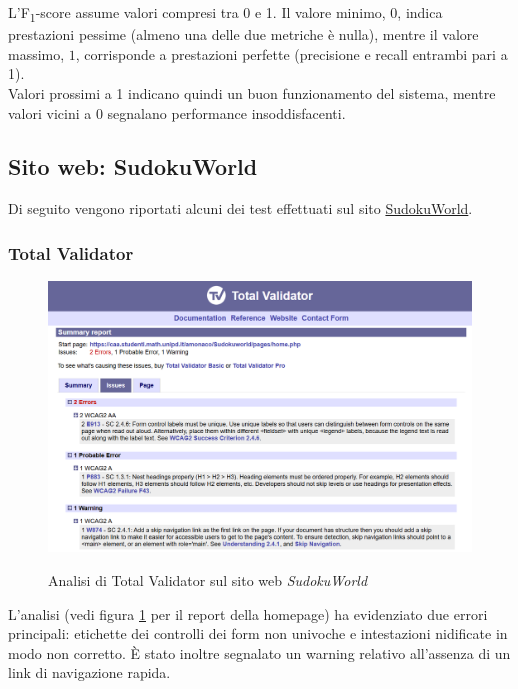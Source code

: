 \noindent L’F\textsubscript{1}-score assume valori compresi tra 0 e 1. Il valore minimo, \(0\), indica prestazioni pessime (almeno una delle due metriche è nulla), mentre il valore massimo, \(1\), corrisponde a prestazioni perfette (precisione e recall entrambi pari a 1).\\
Valori prossimi a 1 indicano quindi un buon funzionamento del sistema, mentre valori vicini a 0 segnalano performance insoddisfacenti.


\subsection{Sito web: SudokuWorld}
\noindent Di seguito vengono riportati alcuni dei test effettuati sul sito \href{https://caa.studenti.math.unipd.it/amonaco/Sudokuworld/pages/home.php}{SudokuWorld}.

\subsubsection{Total Validator}
\begin{figure}[H]
    \centering
    \includegraphics[width=0.7\linewidth, alt={Screenshot dell'analisi di Total Validator sul sito web SudokuWorld}]{img/TV_sudoku.png}
    \caption{Analisi di Total Validator sul sito web \textit{SudokuWorld}}\label{fig:TV_sudoku}
\end{figure}

\noindent L'analisi (vedi figura \ref{fig:TV_sudoku} per il report della homepage) ha evidenziato due errori principali: etichette dei controlli dei form non univoche e intestazioni nidificate in modo non corretto. 
È stato inoltre segnalato un warning relativo all’assenza di un link di navigazione rapida. 
 
